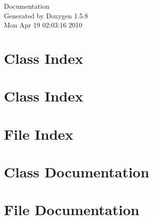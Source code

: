 \documentclass[a4paper]{book}
\begin{document}
\begin{titlepage}
\vspace*{7cm}
\begin{center}
{\Large Documentation }\\
\vspace*{1cm}
{\large Generated by Doxygen 1.5.8}\\
\vspace*{0.5cm}
{\small Mon Apr 19 02:03:16 2010}\\
\end{center}
\end{titlepage}
\clearemptydoublepage
{}
\tableofcontents
\clearemptydoublepage
{}
\chapter{Class Index}

\chapter{Class Index}

\chapter{File Index}

\chapter{Class Documentation}



















\chapter{File Documentation}







































\printindex
\end{document}
